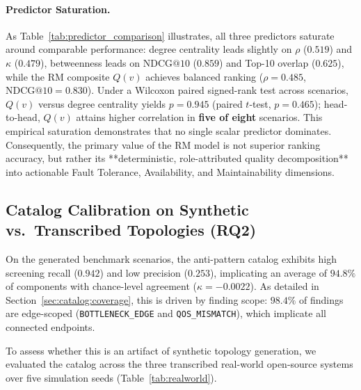 \paragraph{Predictor Saturation.}
As Table~\ref{tab:predictor_comparison} illustrates, all three predictors saturate around comparable performance: degree centrality leads slightly on $\rho$ ($0.519$) and $\kappa$ ($0.479$), betweenness leads on $\mathrm{NDCG@10}$ ($0.859$) and Top-10 overlap ($0.625$), while the RM composite $Q(v)$ achieves balanced ranking ($\rho = 0.485$, $\mathrm{NDCG@10} = 0.830$). Under a Wilcoxon paired signed-rank test across scenarios, $Q(v)$ versus degree centrality yields $p = 0.945$ (paired $t$-test, $p = 0.465$); head-to-head, $Q(v)$ attains higher correlation in \textbf{five of eight} scenarios. This empirical saturation demonstrates that no single scalar predictor dominates. Consequently, the primary value of the RM model is not superior ranking accuracy, but rather its **deterministic, role-attributed quality decomposition** into actionable Fault Tolerance, Availability, and Maintainability dimensions.

\subsection{Catalog Calibration on Synthetic vs.\ Transcribed Topologies (RQ2)}
\label{sec:results:calibration}
\label{sec:results:realworld}

On the generated benchmark scenarios, the anti-pattern catalog exhibits high screening recall ($0.942$) and low precision ($0.253$), implicating an average of $94.8\%$ of components with chance-level agreement ($\kappa = -0.0022$). As detailed in Section~\ref{sec:catalog:coverage}, this is driven by finding scope: $98.4\%$ of findings are edge-scoped (\texttt{BOTTLENECK\_EDGE} and \texttt{QOS\_MISMATCH}), which implicate all connected endpoints.

To assess whether this is an artifact of synthetic topology generation, we evaluated the catalog across the three transcribed real-world open-source systems over five simulation seeds (Table~\ref{tab:realworld}).

